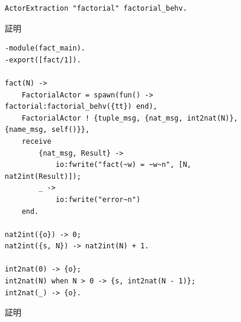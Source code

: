 \begin{figure}[tp]
\begin{lstlisting}
ActorExtraction "factorial" factorial_behv.
\end{lstlisting}
\label{code:overview:extraction}
\caption{証明}
\end{figure}

\begin{figure}
\begin{lstlisting}
-module(fact_main).
-export([fact/1]).

fact(N) ->
    FactorialActor = spawn(fun() -> factorial:factorial_behv({tt}) end),
    FactorialActor ! {tuple_msg, {nat_msg, int2nat(N)}, {name_msg, self()}},
    receive
        {nat_msg, Result} ->
            io:fwrite("fact(~w) = ~w~n", [N, nat2int(Result)]);
        _ ->
            io:fwrite("error~n")
    end.

nat2int({o}) -> 0;
nat2int({s, N}) -> nat2int(N) + 1.

int2nat(0) -> {o};
int2nat(N) when N > 0 -> {s, int2nat(N - 1)};
int2nat(_) -> {o}.
\end{lstlisting}
\label{code:overview:run}
\caption{証明}
\end{figure}
